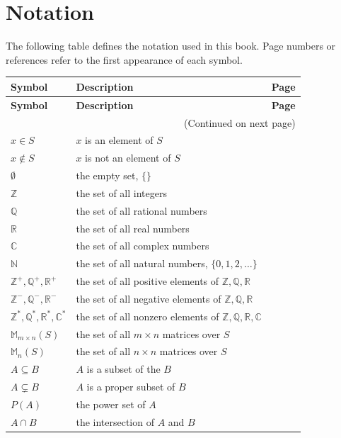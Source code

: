 \documentclass[10pt,]{book}
\theoremstyle{plain}
\theoremstyle{definition}
\theoremstyle{definition}
\theoremstyle{definition}
\theoremstyle{definition}
\numberwithin{equation}{section}
\def\Z{\mathbb{Z}}
\def\R{\mathbb{R}}
\def\Q{\mathbb{Q}}
\def\C{\mathbb{C}}
\def\N{\mathbb{N}}
\def\M{\mathbb{M}}
\begin{document}
\chapter[{Notation}]{Notation}\label{appendix-1}
The following table defines the notation used in this book. Page numbers or references refer to the first appearance of each symbol.%
\begin{longtable}[l]{lp{}r}
\textbf{Symbol}&\textbf{Description}&\textbf{Page}\\[1em]
\endfirsthead
\textbf{Symbol}&\textbf{Description}&\textbf{Page}\\[1em]
\endhead
\multicolumn{3}{r}{(Continued on next page)}\\
\endfoot
\endlastfoot
\(x \in S\)&\(x\) is an element of \(S\)&\pageref{notation-1}\\
\(x \not\in S\)&\(x\) is not an element of \(S\)&\pageref{notation-2}\\
\(\emptyset\)&the empty set, \(\{\}\)&\pageref{notation-3}\\
\(\Z\)&the set of all integers&\pageref{notation-4}\\
\(\Q\)&the set of all rational numbers&\pageref{notation-5}\\
\(\R\)&the set of all real numbers&\pageref{notation-6}\\
\(\C\)&the set of all complex numbers&\pageref{notation-7}\\
\(\N\)&the set of all natural numbers, \(\{0,1,2,\ldots\}\)&\pageref{notation-8}\\
\(\Z^+,\Q^+,\R^+\)&the set of all positive elements of \(\Z,\Q,\R\)&\pageref{notation-9}\\
\(\Z^-,\Q^-,\R^-\)&the set of all negative elements of \(\Z,\Q,\R\)&\pageref{notation-10}\\
\(\Z^*,\Q^*,\R^*,\C^*\)&the set of all nonzero elements of \(\Z,\Q,\R,\C\)&\pageref{notation-11}\\
\(\M_{m\times n}(S)\)&the set of all \(m \times n\) matrices over \(S\)&\pageref{notation-12}\\
\(\M_n(S)\)&the set of all \(n \times n\) matrices over \(S\)&\pageref{notation-13}\\
\(A\subseteq B\)&\(A\) is a subset of the \(B\)&\pageref{notation-14}\\
\(A\subsetneq B\)&\(A\) is a proper subset of \(B\)&\pageref{notation-15}\\
\(P(A)\)&the power set of \(A\)&\pageref{notation-16}\\
\(A\cap B\)&the intersection of  \(A\) and \(B\)&\pageref{notation-17}\\

\end{longtable}
\end{document}
